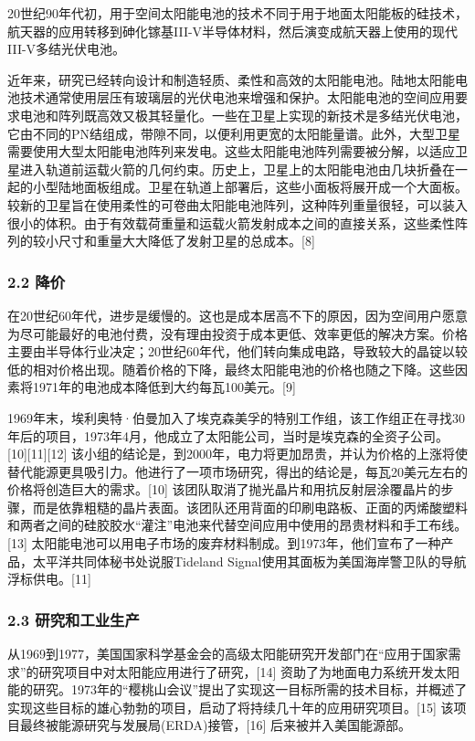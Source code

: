 20世纪90年代初，用于空间太阳能电池的技术不同于用于地面太阳能板的硅技术，航天器的应用转移到砷化镓基III-V半导体材料，然后演变成航天器上使用的现代III-V多结光伏电池。

近年来，研究已经转向设计和制造轻质、柔性和高效的太阳能电池。陆地太阳能电池技术通常使用层压有玻璃层的光伏电池来增强和保护。太阳能电池的空间应用要求电池和阵列既高效又极其轻量化。一些在卫星上实现的新技术是多结光伏电池，它由不同的PN结组成，带隙不同，以便利用更宽的太阳能量谱。此外，大型卫星需要使用大型太阳能电池阵列来发电。这些太阳能电池阵列需要被分解，以适应卫星进入轨道前运载火箭的几何约束。历史上，卫星上的太阳能电池由几块折叠在一起的小型陆地面板组成。卫星在轨道上部署后，这些小面板将展开成一个大面板。较新的卫星旨在使用柔性的可卷曲太阳能电池阵列，这种阵列重量很轻，可以装入很小的体积。由于有效载荷重量和运载火箭发射成本之间的直接关系，这些柔性阵列的较小尺寸和重量大大降低了发射卫星的总成本。[8]

\subsubsection{2.2 降价}

在20世纪60年代，进步是缓慢的。这也是成本居高不下的原因，因为空间用户愿意为尽可能最好的电池付费，没有理由投资于成本更低、效率更低的解决方案。价格主要由半导体行业决定；20世纪60年代，他们转向集成电路，导致较大的晶锭以较低的相对价格出现。随着价格的下降，最终太阳能电池的价格也随之下降。这些因素将1971年的电池成本降低到大约每瓦100美元。[9]

1969年末，埃利奥特·伯曼加入了埃克森美孚的特别工作组，该工作组正在寻找30年后的项目，1973年4月，他成立了太阳能公司，当时是埃克森的全资子公司。[10][11][12] 该小组的结论是，到2000年，电力将更加昂贵，并认为价格的上涨将使替代能源更具吸引力。他进行了一项市场研究，得出的结论是，每瓦20美元左右的价格将创造巨大的需求。[10] 该团队取消了抛光晶片和用抗反射层涂覆晶片的步骤，而是依靠粗糙的晶片表面。该团队还用背面的印刷电路板、正面的丙烯酸塑料和两者之间的硅胶胶水“灌注”电池来代替空间应用中使用的昂贵材料和手工布线。[13] 太阳能电池可以用电子市场的废弃材料制成。到1973年，他们宣布了一种产品，太平洋共同体秘书处说服Tideland Signal使用其面板为美国海岸警卫队的导航浮标供电。[11]

\subsubsection{2.3 研究和工业生产}

从1969到1977，美国国家科学基金会的高级太阳能研究开发部门在“应用于国家需求”的研究项目中对太阳能应用进行了研究，[14] 资助了为地面电力系统开发太阳能的研究。1973年的“樱桃山会议”提出了实现这一目标所需的技术目标，并概述了实现这些目标的雄心勃勃的项目，启动了将持续几十年的应用研究项目。[15] 该项目最终被能源研究与发展局(ERDA)接管，[16] 后来被并入美国能源部。

